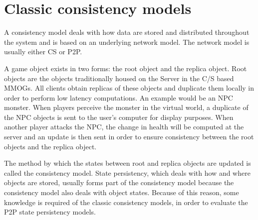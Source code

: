 \documentclass[10pt,a4paper,journal,cspaper,compsoc]{IEEEtran}
\begin{document}
%

\section{Classic consistency models}
\label{classic_models}

A consistency model deals with how data are stored and distributed throughout the system and is based on an underlying network model. The network
model is usually either \ac{CS} or \ac{P2P}.

A game object exists in two forms: the root object and the replica object. Root objects are the objects traditionally housed on the Server in the C/S
based MMOGs. All clients obtain replicas of these objects and duplicate them locally in order to perform low latency computations. An example would
be an NPC monster. When players perceive the monster in the virtual world, a duplicate of the NPC objects is sent to the user's computer for display
purposes. When another player attacks the NPC, the change in health will be computed at the server and an update is then sent in order to ensure
consistency between the root objects and the replica object.

The method by which the states between root and replica objects are updated is called the consistency model. State persistency, which deals with how
and where objects are stored, usually forms part of the consistency model because the consistency model also deals with object states. Because of
this reason, some knowledge is required of the classic consistency models, in order to evaluate the P2P state persistency models.
\end{document}
